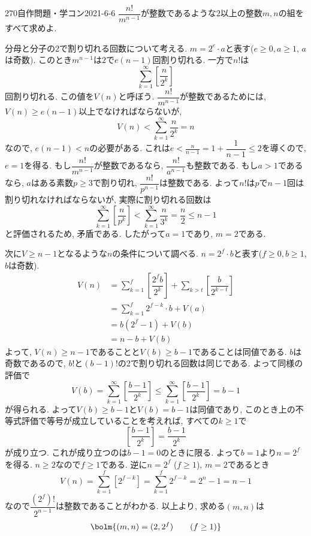 \begin{prob}{270}{}{自作問題・学コン2021-6-6}
$\dfrac{n!}{m^{n-1}}$が整数であるような$2$以上の整数$m,n$の組をすべて求めよ. 
\end{prob}

分母と分子の2で割り切れる回数について考える. $m=2^{e}\cdot a$と表す($e\geq 0, a\geq 1$, $a$は奇数). 
このとき$m^{n-1}$は$2$で$e(n-1)$回割り切れる. 一方で$n!$は
\[
\sum_{k=1}^{\infty} \left[ \dfrac{n}{2^k} \right]    
\] 
回割り切れる. この値を$V(n)$と呼ぼう. $\dfrac{n!}{m^{n-1}}$が整数であるためには, $V(n)\geq e(n-1)$以上でなければならないが, 
\[
    V(n) <  \sum_{k=1}^{\infty} \dfrac{n}{2^k} = n    
\]
なので, $e(n-1) < n$の必要がある. これは$e< \frac{n}{n-1} = 1 + \dfrac{1}{n-1} \leq 2$を導くので, $e=1$を得る. 
もし$\dfrac{n!}{m^{n-1}}$が整数であるなら, $\dfrac{n!}{a^{n-1}}$も整数である. もし$a>1$であるなら, $a$はある素数$p\geq 3$で割り切れ, $\dfrac{n!}{p^{n-1}}$は整数である. 
よって$n!$は$p$で$n-1$回は割り切れなければならないが, 実際に割り切れる回数は
\[
\sum_{k=1}^{\infty} \left[ \dfrac{n}{p^k}\right] < \sum_{k=1}^{\infty} \dfrac{n}{3^k} = \dfrac{n}{2} \leq n-1     
\]
と評価されるため, 矛盾である. したがって$a=1$であり, $m = 2$である. \par 
次に$V \geq n-1$となるような$n$の条件について調べる. $n=2^{f}\cdot b$と表す($f\geq 0, b\geq 1$, $b$は奇数). 
\begin{align*}
    V(n) &= \sum_{k=1}^{f} \left[ \dfrac{2^{f}b}{2^{k}} \right] + \sum_{k>t} \left[\dfrac{b}{2^{k-t}}\right] \\ 
      &= \sum_{k=1}^{f} 2^{f-k} \cdot b + V(a) \\ 
      &= b(2^{f} - 1) + V(b) \\ 
      &= n - b + V(b) 
\end{align*}
よって, $V(n) \geq n-1$であることと$V(b) \geq b-1$であることは同値である. $b$は奇数であるので, $b!$と$(b-1)!$の2で割り切れる回数は同じである. よって同様の評価で
\[
V(b) = \sum_{k=1}^{\infty} \left[ \dfrac{b-1}{2^{k}} \right] \leq \sum_{k=1}^{\infty} \left[\dfrac{b-1}{2^k} \right] = b-1   
\]
が得られる. よって$V(b) \geq b-1$と$V(b) = b-1$は同値であり, このとき上の不等式評価で等号が成立していることを考えれば, すべての$k\geq 1$で
\[
\left[\dfrac{b-1}{2^k}\right] = \dfrac{b-1}{2^k}    
\]
が成り立つ. これが成り立つのは$b-1=0$のときに限る. よって$b=1$より$n=2^{f}$を得る. $n\geq 2$なので$f\geq 1$である. 逆に$n=2^{f}$ ($f\geq 1$), $m=2$であるとき
\[V(n) = \sum_{k=1}^{f} [2^{f-k}] = \sum_{k=1}^{f} 2^{f-k} =  2^{n} - 1  = n-1\]
なので$\dfrac{(2^{f})!}{2^{n-1}}$は整数であることがわかる. 以上より, 求める$(m,n)$は
\[
\bolm{(m,n) = (2,2^{f})\qquad (f\geq 1)}
\]